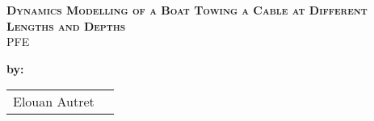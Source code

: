 
\begingroup
\thispagestyle{empty}
\begin{center}
\vspace*{2cm}
{\Huge \textsc{\textbf{Dynamics Modelling of a Boat Towing a Cable at Different Lengths and Depths}}}\\


\vspace*{2cm}
{\huge PFE}\par %
\end{center}

\vspace*{1.5cm}
\textbf{\large by:} 
\begin{center}
{\large
\begin{tabular}{cc}
Elouan Autret \\
\end{tabular}}
\end{center}


